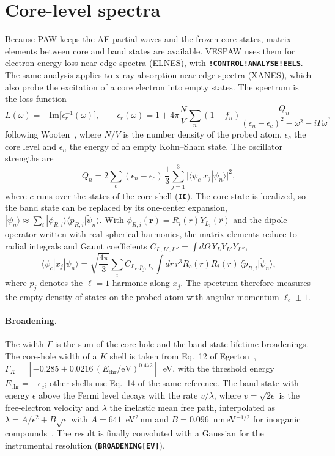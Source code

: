 \documentclass[11pt,a4paper,oneside]{book}
\newcommand{\key}[1]{\textbf{\texttt{#1}}}
\newcommand{\bra}[1]{\langle #1|}
\newcommand{\ket}[1]{|#1\rangle}
\newcommand{\braket}[2]{\langle #1|#2\rangle}
\newcommand{\pt}{\tilde p}
\begin{document}
\section{Core-level spectra}\label{sec:eels}

Because PAW keeps the AE partial waves and the frozen core states,
matrix elements between core and band states are available. VESPAW uses
them for electron-energy-loss near-edge spectra (ELNES), with
\key{!CONTROL!ANALYSE!EELS}. The same analysis applies to x-ray
absorption near-edge spectra (XANES), which also probe the excitation of
a core electron into empty states. The spectrum is the loss function
\begin{equation}
  L(\omega)=-\mathrm{Im}\bigl[\epsilon_r^{-1}(\omega)\bigr],
  \qquad
  \epsilon_r(\omega)=1+4\pi\frac{N}{V}\sum_{n}(1-f_n)
  \frac{Q_n}{(\epsilon_n-\epsilon_c)^2-\omega^2-i\Gamma\omega},
\end{equation}
following Wooten~\cite{wooten72_book}, where $N/V$ is the number density
of the probed atom, $\epsilon_c$ the core level and $\epsilon_n$ the
energy of an empty Kohn--Sham state. The oscillator strengths are
\begin{equation}
  Q_n=2\sum_c(\epsilon_n-\epsilon_c)\,\frac13\sum_{j=1}^3
  \bigl|\bra{\psi_c}x_j\ket{\psi_n}\bigr|^2 ,
\end{equation}
where $c$ runs over the states of the core shell (\key{IC}). The core
state is localized, so the band state can be replaced by its one-center
expansion, $\ket{\psi_n}\approx\sum_i\ket{\phi_{R,i}}\braket{\pt_{R,i}}{\tilde\psi_n}$.
With $\phi_{R,i}(\bm r)=R_i(r)Y_{L_i}(\hat r)$ and the dipole operator
written with real spherical harmonics, the matrix elements reduce to
radial integrals and Gaunt coefficients
$C_{L,L',L''}=\int d\Omega\,Y_LY_{L'}Y_{L''}$,
\begin{equation}
  \bra{\psi_c}x_j\ket{\psi_n}=\sqrt{\frac{4\pi}{3}}\sum_i
  C_{L_c,p_j,L_i}\int dr\,r^3R_c(r)R_i(r)\,\braket{\pt_{R,i}}{\tilde\psi_n},
\end{equation}
where $p_j$ denotes the $\ell=1$ harmonic along $x_j$. The spectrum
therefore measures the empty density of states on the probed atom with
angular momentum $\ell_c\pm1$.

\paragraph{Broadening.} The width $\Gamma$ is the sum of the core-hole
and the band-state lifetime broadenings. The core-hole width of a
$K$ shell is taken from Eq.~12 of
Egerton~\cite{egerton07_ultramicroscopy107_565},
$\Gamma_K=[-0.285+0.0216\,(E_{\mathrm{thr}}/\mathrm{eV})^{0.472}]$~eV, with
the threshold energy $E_{\mathrm{thr}}=-\epsilon_c$; other shells use
Eq.~14 of the same reference. The band state with energy $\epsilon$
above the Fermi level decays with the rate $v/\lambda$, where
$v=\sqrt{2\epsilon}$ is the free-electron velocity and $\lambda$ the
inelastic mean free path, interpolated as
$\lambda=A/\epsilon^2+B\sqrt\epsilon$ with $A=641$~eV$^2$\,nm and
$B=0.096$~nm\,eV$^{-1/2}$ for inorganic compounds~\cite{seah79_surfinterfaceanal1_2}.
The result is finally convoluted with a Gaussian for the instrumental
resolution (\key{BROADENING[EV]}).
\end{document}
